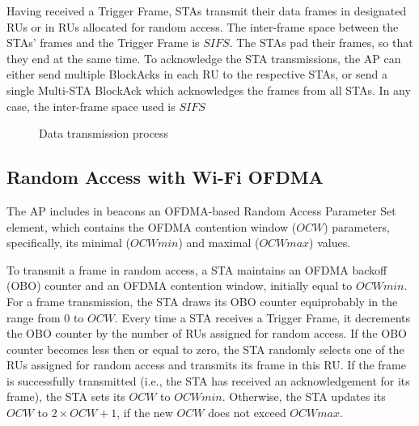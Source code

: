 Having received a Trigger Frame, STAs transmit their data frames in designated RUs or in RUs allocated for random access.
The inter-frame space between the STAs' frames and the Trigger Frame is $SIFS$.
The STAs pad their frames, so that they end at the same time.
To acknowledge the STA transmissions, the AP can either send multiple BlockAcks in each RU to the respective STAs, or send a single Multi-STA BlockAck which acknowledges the frames from all STAs.
In any case, the inter-frame space used is $SIFS$

\begin{figure}[tb]
	\centering
	\caption{\label{fig:transmission} Data transmission process}
\end{figure}


\subsection{Random Access with Wi-Fi OFDMA}
The AP includes in beacons an OFDMA-based Random Access Parameter Set element, which contains the OFDMA contention window ($OCW$) parameters, specifically, its minimal ($OCWmin$) and maximal ($OCWmax$) values.

To transmit a frame in random access, a STA maintains an OFDMA backoff (OBO) counter and an OFDMA contention window, initially equal to $OCWmin$.
For a frame transmission, the STA draws its OBO counter equiprobably in the range from $0$ to $OCW$.
Every time a STA receives a Trigger Frame, it decrements the OBO counter by the number of RUs assigned for random access.
If the OBO counter becomes less then or equal to zero, the STA randomly selects one of the RUs assigned for random access and transmits its frame in this RU.
If the frame is successfully transmitted (i.e., the STA has received an acknowledgement for its frame), the STA sets its $OCW$ to $OCWmin$.
Otherwise, the STA updates its $OCW$ to $2 \times OCW + 1$, if the new $OCW$ does not exceed $OCWmax$.

